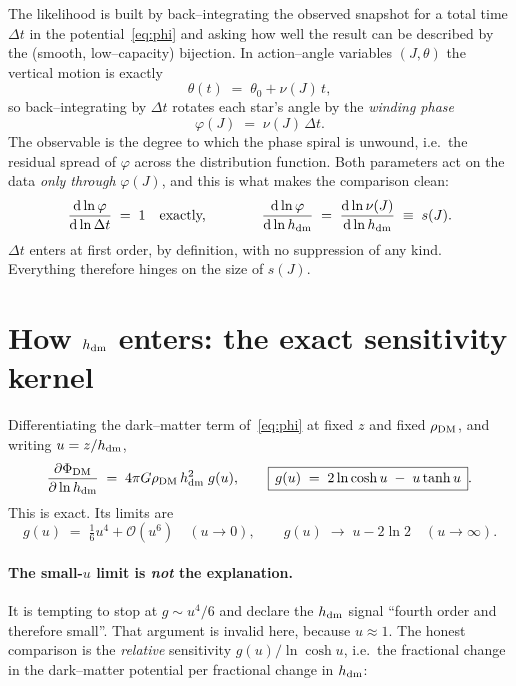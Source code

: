 \documentclass[11pt,a4paper]{article}
\newcommand{\hdm}{h_{\rm dm}}
\newcommand{\dt}{\Delta t}
\newcommand{\dlog}[2]{\frac{\mathrm{d}\ln #1}{\mathrm{d}\ln #2}}
\begin{document}
The likelihood is built by back--integrating the observed snapshot for a total
time $\dt$ in the potential~\eqref{eq:phi} and asking how well the result can be
described by the (smooth, low--capacity) bijection.  In action--angle variables
$(J,\theta)$ the vertical motion is exactly
\begin{equation}
  \theta(t) \;=\; \theta_0 + \nu(J)\,t ,
\end{equation}
so back--integrating by $\dt$ rotates each star's angle by the \emph{winding
phase}
\begin{equation}
  \varphi(J) \;=\; \nu(J)\,\dt .
  \label{eq:phase}
\end{equation}
The observable is the degree to which the phase spiral is unwound, i.e.\ the
residual spread of $\varphi$ across the distribution function.  Both parameters
act on the data \emph{only through} $\varphi(J)$, and this is what makes the
comparison clean:
\begin{equation}
  \dlog{\varphi}{\dt} \;=\; 1 \quad\text{exactly,}
  \qquad\qquad
  \dlog{\varphi}{\hdm} \;=\; \dlog{\nu(J)}{\hdm} \;\equiv\; s(J).
  \label{eq:sens}
\end{equation}
$\dt$ enters at first order, by definition, with no suppression of any kind.
Everything therefore hinges on the size of $s(J)$.

\section{How $\hdm$ enters: the exact sensitivity kernel}

Differentiating the dark--matter term of~\eqref{eq:phi} at fixed $z$ and fixed
$\rho_{\rm DM}$, and writing $u=z/\hdm$,
\begin{equation}
  \frac{\partial \Phi_{\rm DM}}{\partial \ln \hdm}
  \;=\; 4\pi G\rho_{\rm DM}\,\hdm^{2}\;g(u),
  \qquad
  \boxed{\,g(u) \;=\; 2\ln\cosh u \;-\; u\tanh u\,}.
  \label{eq:kernel}
\end{equation}
This is exact.  Its limits are
\begin{equation}
  g(u) \;=\; \tfrac{1}{6}u^{4} + \mathcal{O}(u^{6}) \quad (u\to 0),
  \qquad
  g(u) \;\to\; u - 2\ln 2 \quad (u\to\infty).
\end{equation}

\paragraph{The small-$u$ limit is \emph{not} the explanation.}  It is tempting to
stop at $g\sim u^4/6$ and declare the $\hdm$ signal ``fourth order and therefore
small''.  That argument is invalid here, because $u\approx 1$.  The honest
comparison is the \emph{relative} sensitivity $g(u)/\ln\cosh u$, i.e.\ the
fractional change in the dark--matter potential per fractional change in $\hdm$:
\end{document}
